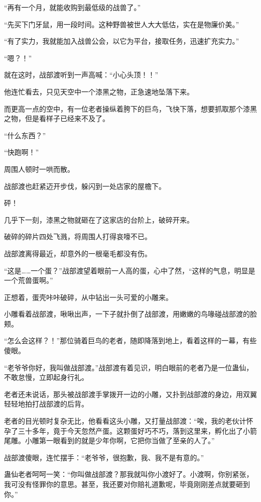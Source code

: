 \begin{this_body}
“再有一个月，就能收购到最低级的战兽了。”

“先买下门牙鼠，用一段时间。这种野兽被世人大大低估，实在是物廉价美。”

“有了实力，我就能加入战兽公会，以它为平台，接取任务，迅速扩充实力。”

“嗯？！”

就在这时，战部渡听到一声高喊：“小心头顶！！”

他连忙看去，只见天空中一个漆黑之物，正急速地坠落下来。

而更高一点的空中，有一位老者操纵着胯下的巨鸟，飞快下落，想要抓取那个漆黑之物，但是看样子已经来不及了。

“什么东西？”

“快跑啊！”

周围人顿时一哄而散。

战部渡也赶紧迈开步伐，躲闪到一处店家的屋檐下。

砰！

几乎下一刻，漆黑之物就砸在了这家店的台阶上，破碎开来。

破碎的碎片四处飞溅，将周围人打得哀嚎不已。

战部渡离得最近，却意外的一根毫毛都没有伤。

“这是……一个蛋？”战部渡望着眼前一人高的蛋，心中了然，“这样的气息，明显是一个荒兽蛋啊。”

正想着，蛋壳咔咔破碎，从中钻出一头可爱的小雕来。

小雕看着战部渡，啾啾出声，一下子就扑倒了战部渡，用嫩嫩的鸟喙碰战部渡的脸颊。

“怎么会这样？！”那位骑着巨鸟的老者，随即降落到地上，看着这样的一幕，有些傻眼。

“老爷爷你好，我叫做战部渡。”战部渡有着见识，明白眼前的老者乃是一位蛊仙，不敢怠慢，立即起身行礼。

老者还未说话，那头被战部渡手掌拨开一边的小雕，又扑到战部渡的身边，用双翼轻轻地拍打战部渡的后背。

老者的目光顿时复杂无比，他看看这头小雕，又打量战部渡：“唉，我的老伙计怀孕了三十多年，竟于今天忽然产蛋。这颗蛋好巧不巧，落到这里来，孵化出了小箭尾雕。小雕第一眼看到的就是少年你啊，它把你当做了至亲的人了。”

战部渡傻眼，连忙摆手：“老爷爷，很抱歉，我、我不是有意的。”

蛊仙老者呵呵一笑：“你叫做战部渡？那我就叫你小渡好了。小渡啊，你别紧张，我可没有怪罪你的意思。甚至，我还要对你赔礼道歉呢，毕竟刚刚差点就要砸到你。”


\end{this_body}
